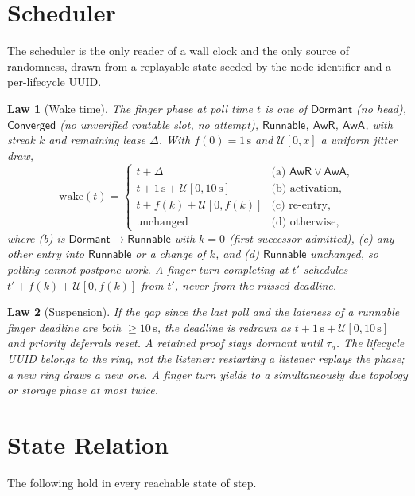 \documentclass[journal]{IEEEtran}
\newtheorem{law}{Law}
\newcommand{\AwR}{\mathsf{AwR}}
\newcommand{\AwA}{\mathsf{AwA}}
\newcommand{\Dormant}{\mathsf{Dormant}}
\newcommand{\Converged}{\mathsf{Converged}}
\newcommand{\Runnable}{\mathsf{Runnable}}
\newcommand{\U}{\mathcal{U}}
\begin{document}
\section{Scheduler}\label{sec:scheduler}

The scheduler is the only reader of a wall clock and the only source of
randomness, drawn from a replayable state seeded by the node identifier
and a per-lifecycle UUID.

\begin{law}[Wake time]\label{law:wake}
The finger phase at poll time $t$ is one of $\Dormant$ (no head),
$\Converged$ (no unverified routable slot, no attempt), $\Runnable$, $\AwR$,
$\AwA$, with streak $k$ and remaining lease $\Delta$.  With
$f(0)=1\,\mathrm{s}$ and $\U[0,x]$ a uniform jitter draw,
\[
\mathrm{wake}(t)=
\begin{cases}
t+\Delta & \text{(a) } \AwR\vee\AwA,\\
t+1\,\mathrm{s}+\U[0,10\,\mathrm{s}] & \text{(b) activation},\\
t+f(k)+\U[0,f(k)] & \text{(c) re-entry},\\
\text{unchanged} & \text{(d) otherwise,}
\end{cases}
\]
where (b) is $\Dormant\to\Runnable$ with $k=0$ (first successor admitted),
(c) any other entry into $\Runnable$ or a change of $k$, and (d)
$\Runnable$ unchanged, so polling cannot postpone work.
A finger turn completing at $t'$ schedules $t'+f(k)+\U[0,f(k)]$ from $t'$,
never from the missed deadline.
\end{law}

\begin{law}[Suspension]\label{law:suspend}
If the gap since the last poll and the lateness of a runnable finger
deadline are both $\ge10\,\mathrm{s}$, the deadline is redrawn as
$t+1\,\mathrm{s}+\U[0,10\,\mathrm{s}]$ and priority deferrals reset.  A
retained proof stays dormant until $\tau_a$.  The lifecycle UUID belongs to
the ring, not the listener: restarting a listener replays the phase; a new
ring draws a new one.  A finger turn yields to a simultaneously due
topology or storage phase at most twice.
\end{law}

\section{State Relation}\label{sec:spec}

The following hold in every reachable state of $\mathrm{step}$.
\end{document}
